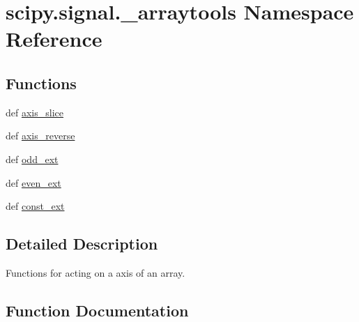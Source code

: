 \hypertarget{namespacescipy_1_1signal_1_1__arraytools}{}\section{scipy.\+signal.\+\_\+arraytools Namespace Reference}
\label{namespacescipy_1_1signal_1_1__arraytools}
\subsection*{Functions}
\begin{DoxyCompactItemize}
\item 
def \hyperlink{namespacescipy_1_1signal_1_1__arraytools_abebf110231c60eddb9125c655176aaab}{axis\+\_\+slice}
\item 
def \hyperlink{namespacescipy_1_1signal_1_1__arraytools_afdd406f1baba45fd2e9acb0371dd4e51}{axis\+\_\+reverse}
\item 
def \hyperlink{namespacescipy_1_1signal_1_1__arraytools_ab1835a0fd9d85f9a1c4a19a4da40d684}{odd\+\_\+ext}
\item 
def \hyperlink{namespacescipy_1_1signal_1_1__arraytools_a2a1f3d1c40b0b17f2591ff127d4a326f}{even\+\_\+ext}
\item 
def \hyperlink{namespacescipy_1_1signal_1_1__arraytools_a62dcdfeb3b901949972283f5e6f0622f}{const\+\_\+ext}
\end{DoxyCompactItemize}


\subsection{Detailed Description}
\begin{DoxyVerb}Functions for acting on a axis of an array.
\end{DoxyVerb}
 

\subsection{Function Documentation}
\hypertarget{namespacescipy_1_1signal_1_1__arraytools_afdd406f1baba45fd2e9acb0371dd4e51}{}
